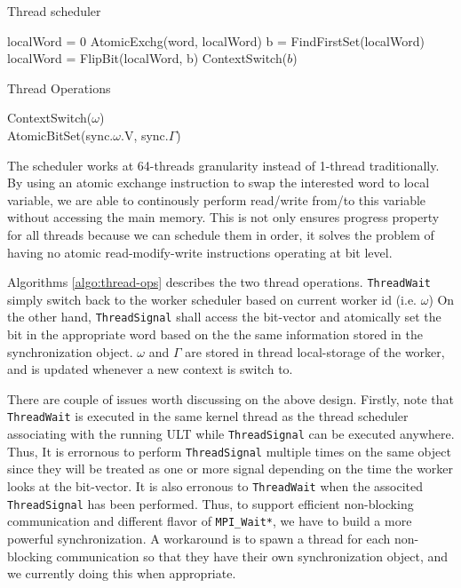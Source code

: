 \begin{algorithm}
  \caption{Thread scheduler}
  \label{algo:thread}
  \begin{algorithmic}[1]
     
     
        \State localWord = 0
        \State AtomicExchg(word, localWord)
          \State b = FindFirstSet(localWord)
          \State localWord = FlipBit(localWord, b)
          \State ContextSwitch($b$)
        \EndWhile
      \EndIf
      \EndFor
    \EndWhile
    \EndProcedure
  \end{algorithmic}
\end{algorithm}

\begin{algorithm}
  \caption{Thread Operations}
  \label{algo:thread-ops}
  \begin{algorithmic}[1]
      \State ContextSwitch($\omega$)
    \EndProcedure
    \\ 
      \State AtomicBitSet(sync.$\omega$.V, sync.$\Gamma$)
    \EndProcedure
  \end{algorithmic}
\end{algorithm}

The scheduler works at 64-threads granularity instead of 1-thread traditionally.
By using an atomic exchange instruction to swap the interested word to local variable, we
are able to continously perform read/write from/to this variable without
accessing the main memory. This is not only ensures progress property for all
threads because we can schedule them in order, it solves the problem of having
no atomic read-modify-write instructions operating at bit level.

Algorithms \ref{algo:thread-ops} describes the two thread operations.
\texttt{ThreadWait} simply switch back to the worker scheduler based on current
worker id (i.e. $\omega$) On the other hand, \texttt{ThreadSignal} shall access
the bit-vector and atomically set the bit in the appropriate word based on the
the same information stored in the synchronization object. $\omega$ and
$\Gamma$ are stored in thread local-storage of the worker, and is updated
whenever a new context is switch to.

There are couple of issues worth discussing on the above design.  Firstly, note
that \texttt{ThreadWait} is executed in the same kernel thread as the thread
scheduler associating with the running ULT while \texttt{ThreadSignal} can be
executed anywhere. Thus, It is errornous to perform \texttt{ThreadSignal}
multiple times on the same object since they will be treated as one or more
signal depending on the time the worker looks at the bit-vector. It is also
erronous to \texttt{ThreadWait} when the associted \texttt{ThreadSignal} has
been performed. Thus, to support efficient non-blocking communication and
different flavor of \texttt{MPI_Wait*}, we have to build a more powerful
synchronization.  A workaround is to spawn a thread for each non-blocking
communication so that they have their own synchronization object, and we
currently doing this when appropriate.


